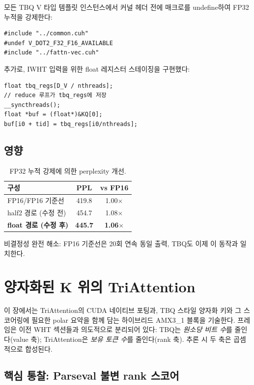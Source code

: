 \documentclass[10pt,twocolumn]{article}
\begin{document}
모든 TBQ V 타입 템플릿 인스턴스에서 커널 헤더 전에 매크로를 undefine하여 FP32 누적을 강제한다:
\begin{verbatim}
#include "../common.cuh"
#undef V_DOT2_F32_F16_AVAILABLE
#include "../fattn-vec.cuh"
\end{verbatim}

추가로, IWHT 입력을 위한 float 레지스터 스테이징을 구현했다:
\begin{verbatim}
float tbq_regs[D_V / nthreads];
// reduce 루프가 tbq_regs에 저장
__syncthreads();
float *buf = (float*)&KQ[0];
buf[i0 + tid] = tbq_regs[i0/nthreads];
\end{verbatim}

\subsection{영향}

\begin{table}[h]
\centering
\small
\begin{tabular}{@{}lcc@{}}
\toprule
구성 & PPL & vs FP16 \\
\midrule
FP16/FP16 기준선 & 419.8 & 1.00$\times$ \\
half2 경로 (수정 전) & 454.7 & 1.08$\times$ \\
\textbf{float 경로 (수정 후)} & \textbf{445.7} & \textbf{1.06$\times$} \\
\bottomrule
\end{tabular}
\caption{FP32 누적 강제에 의한 perplexity 개선.}
\end{table}

비결정성 완전 해소: FP16 기준선은 20회 연속 동일 출력, TBQ도 이제 이 동작과 일치한다.

\section{양자화된 K 위의 TriAttention}
\label{sec:triattention}

이 장에서는 TriAttention의 CUDA 네이티브 포팅과, TBQ 스타일 양자화 키와 그 스코어링에 필요한 polar 요약을 함께 담는 하이브리드 AMX3\_1 블록을 기술한다. 프레임은 이전 WHT 섹션들과 의도적으로 분리되어 있다: TBQ는 \emph{원소당 비트 수}를 줄인다(value 축); TriAttention은 \emph{보유 토큰 수}를 줄인다(rank 축). 추론 시 두 축은 곱셈적으로 합성된다.

\subsection{핵심 통찰: Parseval 불변 rank 스코어}
\end{document}
